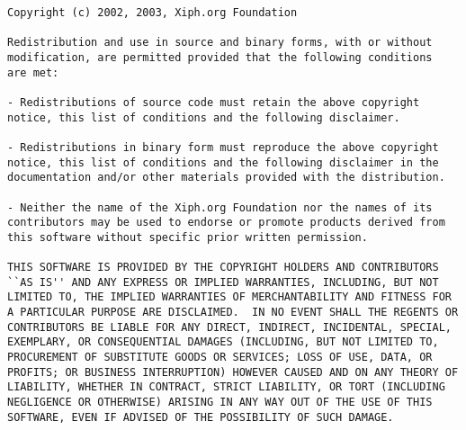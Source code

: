 \footnotesize\begin{verbatim}Copyright (c) 2002, 2003, Xiph.org Foundation

Redistribution and use in source and binary forms, with or without
modification, are permitted provided that the following conditions
are met:

- Redistributions of source code must retain the above copyright
notice, this list of conditions and the following disclaimer.

- Redistributions in binary form must reproduce the above copyright
notice, this list of conditions and the following disclaimer in the
documentation and/or other materials provided with the distribution.

- Neither the name of the Xiph.org Foundation nor the names of its
contributors may be used to endorse or promote products derived from
this software without specific prior written permission.

THIS SOFTWARE IS PROVIDED BY THE COPYRIGHT HOLDERS AND CONTRIBUTORS
``AS IS'' AND ANY EXPRESS OR IMPLIED WARRANTIES, INCLUDING, BUT NOT
LIMITED TO, THE IMPLIED WARRANTIES OF MERCHANTABILITY AND FITNESS FOR
A PARTICULAR PURPOSE ARE DISCLAIMED.  IN NO EVENT SHALL THE REGENTS OR
CONTRIBUTORS BE LIABLE FOR ANY DIRECT, INDIRECT, INCIDENTAL, SPECIAL,
EXEMPLARY, OR CONSEQUENTIAL DAMAGES (INCLUDING, BUT NOT LIMITED TO,
PROCUREMENT OF SUBSTITUTE GOODS OR SERVICES; LOSS OF USE, DATA, OR
PROFITS; OR BUSINESS INTERRUPTION) HOWEVER CAUSED AND ON ANY THEORY OF
LIABILITY, WHETHER IN CONTRACT, STRICT LIABILITY, OR TORT (INCLUDING
NEGLIGENCE OR OTHERWISE) ARISING IN ANY WAY OUT OF THE USE OF THIS
SOFTWARE, EVEN IF ADVISED OF THE POSSIBILITY OF SUCH DAMAGE.
\end{verbatim}\normalsize
 